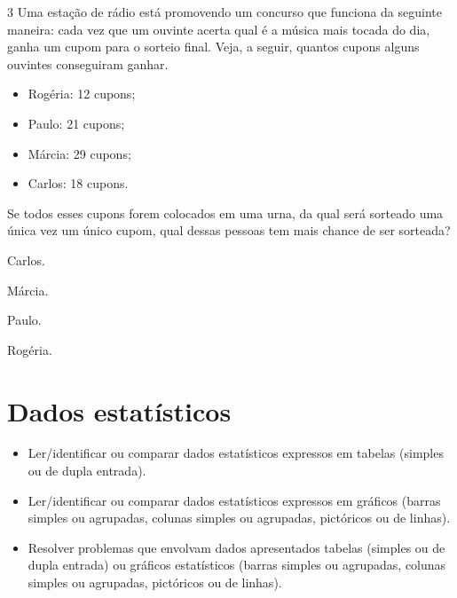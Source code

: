\num{3} Uma estação de rádio está promovendo um concurso que funciona da seguinte maneira: cada vez que um ouvinte acerta qual é a música mais tocada do dia, ganha um cupom para o sorteio final. Veja, a seguir, quantos cupons alguns ouvintes conseguiram ganhar.

\begin{mdframed}[linewidth=2pt,linecolor=azul!20,backgroundcolor=azul!20,roundcorner=2pt]
\begin{itemize}
  \item Rogéria: 12 cupons;
  \item Paulo: 21 cupons;
  \item Márcia: 29 cupons;
  \item Carlos: 18 cupons.
\end{itemize}
\end{mdframed}

Se todos esses cupons forem colocados em uma urna, da qual será sorteado uma única vez um único cupom, qual dessas pessoas tem mais chance de ser sorteada?

\begin{escolha}
\item
  Carlos.
\item
  Márcia.
\item
  Paulo.
\item
  Rogéria.
\end{escolha}


\chapter{Dados estatísticos}


\begin{itemize}
\item Ler/identificar ou comparar dados estatísticos expressos em tabelas
(simples ou de dupla entrada).

\item Ler/identificar ou comparar dados estatísticos expressos em gráficos
(barras simples ou agrupadas, colunas simples ou agrupadas, pictóricos
ou de linhas).

\item Resolver problemas que envolvam dados apresentados tabelas (simples ou
de dupla entrada) ou gráficos estatísticos (barras simples ou agrupadas,
colunas simples ou agrupadas, pictóricos ou de linhas).
\end{itemize}

